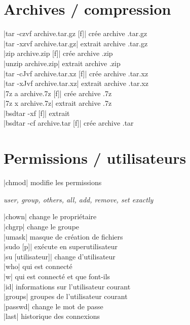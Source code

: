 \documentclass[9pt]{extarticle}
\newenvironment{cmdblock}{%
  \par\setlength{\parindent}{0pt}\setlength{\parskip}{0pt}%
  \RaggedRight%
}{\par}
\newlength{\cmdoptindent}
\newcommand{\cmdopt}[1]{%
  \hspace*{\cmdoptindent}%
  \begin{minipage}[t]{\dimexpr\linewidth-\cmdoptindent\relax}
    \RaggedRight \itshape #1%
  \end{minipage}\par
}
\begin{document}
\begin{multicols}{4}
\begin{tabbing}
    \end{tabbing}

    \section*{Archives / compression}
    \begin{cmdblock}
        \code|tar -czvf archive.tar.gz [f]| \quad crée archive .tar.gz \\
        \code|tar -xzvf archive.tar.gz| \quad extrait archive .tar.gz \\
        \code|zip archive.zip [f]| \quad crée archive .zip \\
        \code|unzip archive.zip| \quad extrait archive .zip \\
        \code|tar -cJvf archive.tar.xz [f]| \quad crée archive .tar.xz \\
        \code|tar -xJvf archive.tar.xz| \quad extrait archive .tar.xz \\
        \code|7z a archive.7z [f]| \quad crée archive .7z \\
        \code|7z x archive.7z| \quad extrait archive .7z \\
        \code|bsdtar -xf [f]| \quad extrait \\
        \code|bsdtar -cf archive.tar [f]| \quad crée archive .tar \\
    \end{cmdblock}

    \section*{Permissions / utilisateurs}

    \begin{cmdblock}
        \code|chmod| \quad modifie les permissions \\
        \cmdopt{ user,  group,  others,  all,
            \codx{+} add, \codx{-} remove, \codx{=} set exactly}
        \code|chown| \quad change le propriétaire \\
        \code|chgrp| \quad change le groupe \\
        \code|umask| \quad masque de création de fichiers \\
        \code|sudo [p]| \quad exécute en superutilisateur \\
        \code|su [utilisateur]| \quad change d'utilisateur \\
        \code|who| \quad qui est connecté \\
        \code|w| \quad qui est connecté et que font-ils \\
        \code|id| \quad informations sur l'utilisateur courant \\
        \code|groups| \quad groupes de l'utilisateur courant \\
        \code|passwd| \quad change le mot de passe \\
        \code|last| \quad historique des connexions \\
    \end{cmdblock}


\end{multicols}
\end{document}
